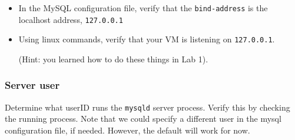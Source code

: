 \documentclass{article}
\begin{document}

\begin{itemize}
\item In the MySQL configuration file, verify that the {\tt bind-address} is the localhost address, {\tt 127.0.0.1}
\item Using linux commands, verify that your VM is listening on {\tt 127.0.0.1}. \par(Hint: you learned how to do these things in Lab 1).
  
\end{itemize}


\subsubsection{Server user} Determine what userID runs the {\tt mysqld} server process.  Verify this by checking the running process.  Note that we could specify a different user in the mysql configuration file, if needed. However, the default will work for now.


 \\
\noindent 
\end{document}
